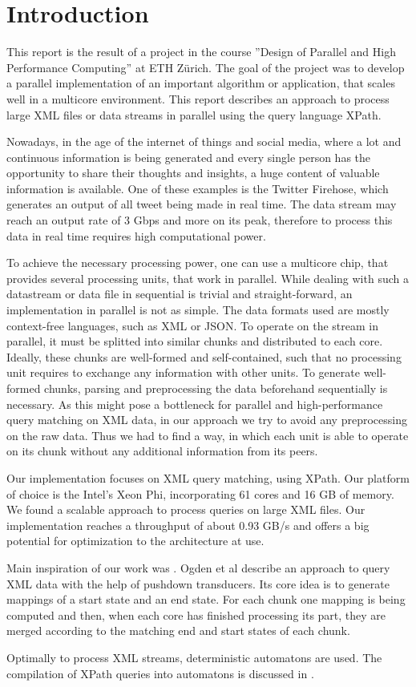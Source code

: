 \section{Introduction}\label{sec:intro}

This report is the result of a project in the course ''Design of Parallel and High Performance Computing'' at ETH Z\"urich. The goal of the project was to develop a parallel implementation of an important algorithm or application, that scales well in a multicore environment. This report describes an approach to process large XML files or data streams in parallel using the query language XPath.

 Nowadays, in the age of the internet of things and social media, where a lot and continuous information is being generated and every single person has the opportunity to share their thoughts and insights, a huge content of valuable information is available. One of these examples is the Twitter Firehose, which generates an output of all tweet being made in real time. The data stream may reach an output rate of 3 Gbps and more on  its peak, therefore to process this data in real time requires high computational power.

To achieve the necessary processing power, one can use a multicore chip, that provides several processing units, that work in parallel. While dealing with such a datastream or data file in sequential is trivial and straight-forward, an implementation in parallel is not as simple. The data formats used are mostly context-free languages, such as XML or JSON. To operate on the stream in parallel, it must be splitted into similar chunks and distributed to each core. Ideally, these chunks are well-formed and self-contained, such that no processing unit requires to exchange any information with other units. To generate well-formed chunks, parsing and preprocessing the data beforehand sequentially is necessary. As this might pose a bottleneck for parallel and high-performance query matching on XML data, in our approach we try to avoid any preprocessing on the raw data. Thus we had to find a way, in which each unit is able to operate on its chunk without any additional information from its peers.

Our implementation focuses on XML query matching, using XPath. Our platform of choice is the Intel's Xeon Phi, incorporating 61 cores and 16 GB of memory. We found a scalable approach to process queries on large XML files. Our implementation reaches a throughput of about 0.93 GB/s and offers a big potential for optimization to the architecture at use. 

 Main inspiration of our work was \cite{Ogden2013}. Ogden et al describe an approach to query XML data with the help of pushdown transducers. Its core idea is to generate mappings of a start state and an end state. For each chunk one mapping is being computed and then, when each core has finished processing its part, they are merged according to the matching end and start states of each chunk.

Optimally to process XML streams, deterministic automatons are used. The compilation of XPath queries into automatons is discussed in \cite{Green2004}.